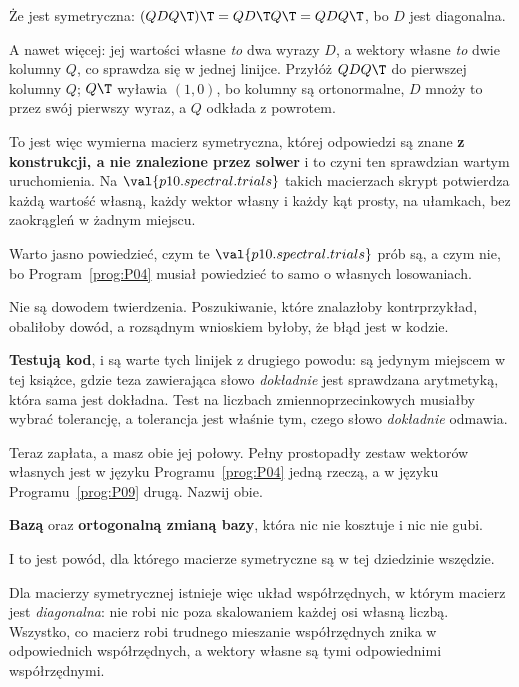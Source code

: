 \begin{fr}
\begin{ansblock}
Że jest symetryczna: $(QDQ\T)\T = Q D\T Q\T = Q D Q\T$, bo $D$ jest diagonalna.
\end{ansblock}

A nawet więcej: jej wartości własne \emph{to} dwa wyrazy $D$, a wektory własne
\emph{to} dwie kolumny $Q$, co sprawdza się w jednej linijce. Przyłóż $QDQ\T$
do pierwszej kolumny $Q$; $Q\T$ wyławia $(1,0)$, bo kolumny są ortonormalne,
$D$ mnoży to przez swój pierwszy wyraz, a $Q$ odkłada z powrotem.

To jest więc wymierna macierz symetryczna, której odpowiedzi są znane
\textbf{z konstrukcji, a nie znalezione przez solwer} \dash{} i to czyni ten
sprawdzian wartym uruchomienia. Na $\val{p10.spectral.trials}$ takich
macierzach skrypt potwierdza każdą wartość własną, każdy wektor własny i każdy
kąt prosty, na ułamkach, bez zaokrągleń w żadnym miejscu.
\end{fr}

\begin{fr}
Warto jasno powiedzieć, czym te $\val{p10.spectral.trials}$ prób są, a czym
nie, bo Program~\ref{prog:P04} musiał powiedzieć to samo o własnych losowaniach.

Nie są dowodem twierdzenia. Poszukiwanie, które znalazłoby kontrprzykład,
obaliłoby dowód, a rozsądnym wnioskiem byłoby, że błąd jest w kodzie.

\textbf{Testują kod}, i są warte tych linijek z drugiego powodu: są jedynym
miejscem w tej książce, gdzie teza zawierająca słowo \emph{dokładnie} jest
sprawdzana arytmetyką, która sama jest dokładna. Test na liczbach
zmiennoprzecinkowych musiałby wybrać tolerancję, a tolerancja jest właśnie
tym, czego słowo \emph{dokładnie} odmawia.

Teraz zapłata, a masz obie jej połowy. Pełny prostopadły zestaw wektorów
własnych jest w języku Programu~\ref{prog:P04} jedną rzeczą, a w języku
Programu~\ref{prog:P09} drugą. Nazwij obie.
\dotline
\nextframe
\end{fr}

\begin{fr}
\begin{ansblock}
\textbf{Bazą} \dash{} oraz \textbf{ortogonalną zmianą bazy}, która nic nie
kosztuje i nic nie gubi.
\end{ansblock}

I to jest powód, dla którego macierze symetryczne są w tej dziedzinie wszędzie.

Dla macierzy symetrycznej istnieje więc układ współrzędnych, w którym macierz
jest \emph{diagonalna}: nie robi nic poza skalowaniem każdej osi własną liczbą.
Wszystko, co macierz robi trudnego \dash{} mieszanie współrzędnych \dash{}
znika w odpowiednich współrzędnych, a wektory własne są tymi odpowiednimi
współrzędnymi.
\end{fr}

